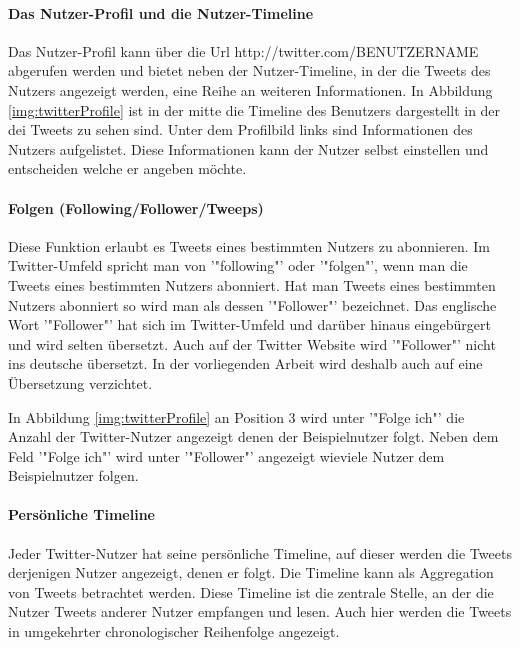 			\paragraph{Das Nutzer-Profil und die Nutzer-Timeline}
				Das Nutzer-Profil kann über die Url http://twitter.com/BENUTZERNAME abgerufen werden und bietet neben der Nutzer-Timeline, in der die Tweets des Nutzers angezeigt werden, eine Reihe an weiteren Informationen.
				In Abbildung \ref{img:twitterProfile} ist in der mitte die Timeline des Benutzers dargestellt in der dei Tweets zu sehen sind. 
				Unter dem Profilbild links sind Informationen des Nutzers aufgelistet.
				Diese Informationen kann der Nutzer selbst einstellen und entscheiden welche er angeben möchte.   


			\paragraph{Folgen (Following/Follower/Tweeps)}
				Diese Funktion erlaubt es Tweets eines bestimmten Nutzers zu abonnieren. 
				Im Twitter-Umfeld spricht man von '"following"' oder '"folgen"', wenn man die Tweets eines bestimmten Nutzers abonniert.
				Hat man Tweets eines bestimmten Nutzers abonniert so wird man als dessen '"Follower"' bezeichnet. 
				Das englische Wort '"Follower"' hat sich im Twitter-Umfeld und darüber hinaus eingebürgert und wird selten übersetzt. 
				Auch auf der Twitter Website wird '"Follower"' nicht ins deutsche übersetzt.
				In der vorliegenden Arbeit wird deshalb auch auf eine Übersetzung verzichtet. 

				In Abbildung \ref{img:twitterProfile} an Position 3 wird unter '"Folge ich"' die Anzahl der Twitter-Nutzer angezeigt denen der Beispielnutzer folgt. 
				Neben dem Feld '"Folge ich"' wird unter '"Follower"' angezeigt wieviele Nutzer dem Beispielnutzer folgen.

			\paragraph{Persönliche Timeline}
				Jeder Twitter-Nutzer hat seine persönliche Timeline, auf dieser werden die Tweets derjenigen Nutzer angezeigt, denen er folgt. 
				Die Timeline kann als Aggregation von Tweets betrachtet werden.
				Diese Timeline ist die zentrale Stelle, an der die Nutzer Tweets anderer Nutzer empfangen und lesen.
				Auch hier werden die Tweets in umgekehrter chronologischer Reihenfolge angezeigt.  

